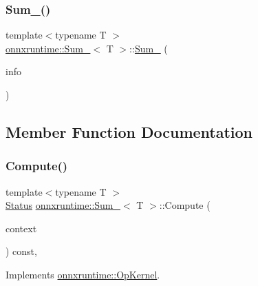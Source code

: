 \subsubsection{\texorpdfstring{Sum\+\_()}{Sum\_8()}}
{\footnotesize\ttfamily template$<$typename T $>$ \\
\mbox{\hyperlink{classonnxruntime_1_1Sum__8}{onnxruntime\+::\+Sum\+\_}}$<$ T $>$\+::\mbox{\hyperlink{classonnxruntime_1_1Sum__8}{Sum\+\_}} (\begin{DoxyParamCaption}\item[{const \mbox{\hyperlink{classonnxruntime_1_1OpKernelInfo}{Op\+Kernel\+Info}} \&}]{info }\end{DoxyParamCaption})\hspace{0.3cm}{\ttfamily [inline]}}



\subsection{Member Function Documentation}
\mbox{\label{classonnxruntime_1_1Sum__8_adf40238e59455d0cdb97d0477c0bcbb4}} 
\subsubsection{\texorpdfstring{Compute()}{Compute()}\hspace{0.1cm}{\footnotesize\ttfamily [1/2]}}
{\footnotesize\ttfamily template$<$typename T $>$ \\
\mbox{\hyperlink{classonnxruntime_1_1common_1_1Status}{Status}} \mbox{\hyperlink{classonnxruntime_1_1Sum__8}{onnxruntime\+::\+Sum\+\_}}$<$ T $>$\+::Compute (\begin{DoxyParamCaption}\item[{\mbox{\hyperlink{classonnxruntime_1_1OpKernelContext}{Op\+Kernel\+Context}} $\ast$}]{context }\end{DoxyParamCaption}) const\hspace{0.3cm}{\ttfamily [override]}, {\ttfamily [virtual]}}



Implements \mbox{\hyperlink{classonnxruntime_1_1OpKernel_a9eca8656a78b1b3ab9d3351a12798650}{onnxruntime\+::\+Op\+Kernel}}.

\mbox{\label{classonnxruntime_1_1Sum__8_a595e027371b8ae64302a0164d9d35b2c}} 
